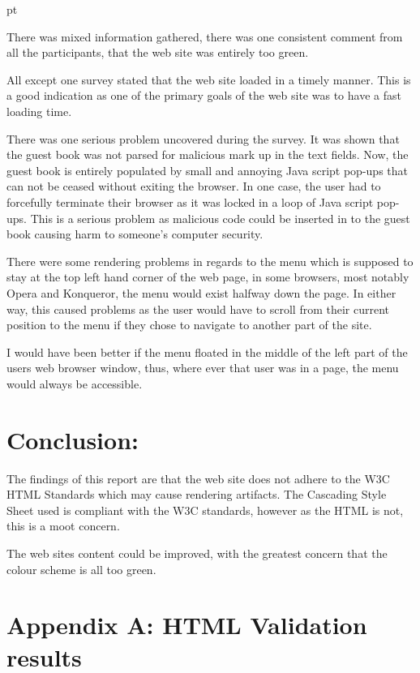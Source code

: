  pt

There was mixed information gathered, there was one consistent comment from
all the participants, that the web site was entirely too green.

All except one survey stated that the web site loaded in a timely manner. This
is a good indication as one of the primary goals of the web site was to have a
fast loading time.

There was one serious problem uncovered during the survey. It was shown that
the guest book was not parsed for malicious mark up in the text fields. Now, the
guest book is entirely populated by small and annoying Java script pop-ups that
can not be ceased without exiting the browser. In one case, the user had to
forcefully terminate their browser as it was locked in a loop of Java script
pop-ups. This is a serious problem as malicious code could be inserted in to
the guest book causing harm to someone's computer security.

There were some rendering problems in regards to the menu which is supposed to
stay at the top left hand corner of the web page, in some browsers, most
notably Opera and Konqueror, the menu would exist halfway down the page. In
either way, this caused problems as the user would have to scroll from their
current position to the menu if they chose to navigate to another part of the
site.

I would have been better if the menu floated in the middle of the left part
of the users web browser window, thus, where ever that user was in a page, the
menu would always be accessible.

\section{Conclusion:}

The findings of this report are that the web site does not adhere to the W3C
HTML Standards which may cause rendering artifacts. The Cascading Style Sheet
used is compliant with the W3C standards, however as the HTML is not, this is
a moot concern.

The web sites content could be improved, with the greatest concern that the
colour scheme is all too green.

\section{Appendix A: HTML Validation results}

